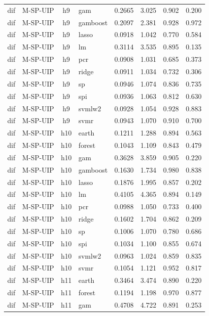 \begin{ThreePartTable}
\begin{longtable}[t]{llclcccc}
dif & M-SP-UIP & h9 & gam & 0.2665 & 3.025 & 0.902 & 0.200\\
dif & M-SP-UIP & h9 & gamboost & 0.2097 & 2.381 & 0.928 & 0.972\\
dif & M-SP-UIP & h9 & lasso & 0.0918 & 1.042 & 0.770 & 0.584\\
dif & M-SP-UIP & h9 & lm & 0.3114 & 3.535 & 0.895 & 0.135\\
dif & M-SP-UIP & h9 & pcr & 0.0908 & 1.031 & 0.685 & 0.373\\
dif & M-SP-UIP & h9 & ridge & 0.0911 & 1.034 & 0.732 & 0.306\\
dif & M-SP-UIP & h9 & sp & 0.0946 & 1.074 & 0.836 & 0.735\\
dif & M-SP-UIP & h9 & spi & 0.0936 & 1.063 & 0.812 & 0.630\\
dif & M-SP-UIP & h9 & svmlw2 & 0.0928 & 1.054 & 0.928 & 0.883\\
dif & M-SP-UIP & h9 & svmr & 0.0943 & 1.070 & 0.910 & 0.700\\
\addlinespace
dif & M-SP-UIP & h10 & earth & 0.1211 & 1.288 & 0.894 & 0.563\\
dif & M-SP-UIP & h10 & forest & 0.1043 & 1.109 & 0.843 & 0.479\\
dif & M-SP-UIP & h10 & gam & 0.3628 & 3.859 & 0.905 & 0.220\\
dif & M-SP-UIP & h10 & gamboost & 0.1630 & 1.734 & 0.980 & 0.838\\
dif & M-SP-UIP & h10 & lasso & 0.1876 & 1.995 & 0.857 & 0.202\\
dif & M-SP-UIP & h10 & lm & 0.4105 & 4.365 & 0.894 & 0.149\\
dif & M-SP-UIP & h10 & pcr & 0.0988 & 1.050 & 0.733 & 0.400\\
dif & M-SP-UIP & h10 & ridge & 0.1602 & 1.704 & 0.862 & 0.209\\
dif & M-SP-UIP & h10 & sp & 0.1006 & 1.070 & 0.780 & 0.686\\
dif & M-SP-UIP & h10 & spi & 0.1034 & 1.100 & 0.855 & 0.674\\
dif & M-SP-UIP & h10 & svmlw2 & 0.0963 & 1.024 & 0.859 & 0.835\\
dif & M-SP-UIP & h10 & svmr & 0.1054 & 1.121 & 0.952 & 0.817\\
\addlinespace
dif & M-SP-UIP & h11 & earth & 0.3464 & 3.474 & 0.890 & 0.220\\
dif & M-SP-UIP & h11 & forest & 0.1194 & 1.198 & 0.970 & 0.877\\
dif & M-SP-UIP & h11 & gam & 0.4708 & 4.722 & 0.891 & 0.253\\

\end{longtable}
\end{ThreePartTable}
